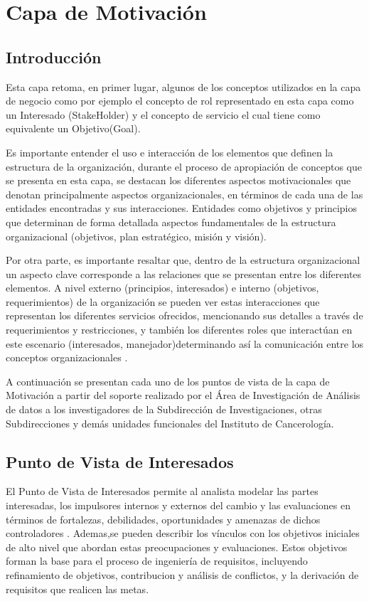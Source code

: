 \chapter{Capa de Motivación}
\section{Introducción}

Esta capa retoma, en primer lugar, algunos de los conceptos utilizados en la capa de negocio como por ejemplo el concepto de rol representado en esta capa como un Interesado (StakeHolder) y el concepto de servicio el cual tiene como equivalente un Objetivo(Goal)\cite{BolanosCastro2019}.

Es importante entender el uso e interacción de los elementos que definen la estructura de la organización, durante el proceso de apropiación de conceptos que se presenta en esta capa, se destacan los diferentes aspectos motivacionales que denotan principalmente aspectos organizacionales, en términos de cada una de las entidades encontradas y sus interacciones. Entidades como objetivos y principios que
determinan de forma detallada aspectos fundamentales de la estructura organizacional (objetivos, plan estratégico, misión y visión)\cite{BolanosCastro2019}.

Por otra parte, es importante resaltar que, dentro de la estructura organizacional un aspecto clave corresponde a las relaciones que se presentan entre los diferentes elementos. A nivel externo (principios, interesados) e interno (objetivos, requerimientos) de la organización se pueden ver estas interacciones que representan los diferentes servicios ofrecidos, mencionando sus detalles a través de requerimientos y restricciones, y también los diferentes roles que interactúan en este escenario (interesados, manejador)determinando así la comunicación entre los conceptos organizacionales \cite{BolanosCastro2019}. 

A continuación se presentan cada uno de los puntos de vista de la capa de Motivación  a partir del soporte realizado por el Área de Investigación de Análisis de datos a los investigadores de la Subdirección de Investigaciones, otras Subdirecciones y demás unidades funcionales del Instituto de Cancerología.

\newpage
\section{Punto de Vista de Interesados}
El Punto de Vista de Interesados permite al analista modelar las partes interesadas, los impulsores internos y externos del cambio y las evaluaciones en términos de fortalezas, debilidades, oportunidades y amenazas de dichos controladores . Ademas,se pueden describir los vínculos con los objetivos iniciales de alto nivel que abordan estas preocupaciones y evaluaciones. Estos objetivos forman la base para el proceso de ingeniería de requisitos, incluyendo refinamiento de objetivos, contribucion y análisis de conflictos, y la derivación de requisitos que realicen las metas\cite{BolanosCastro2019}.

